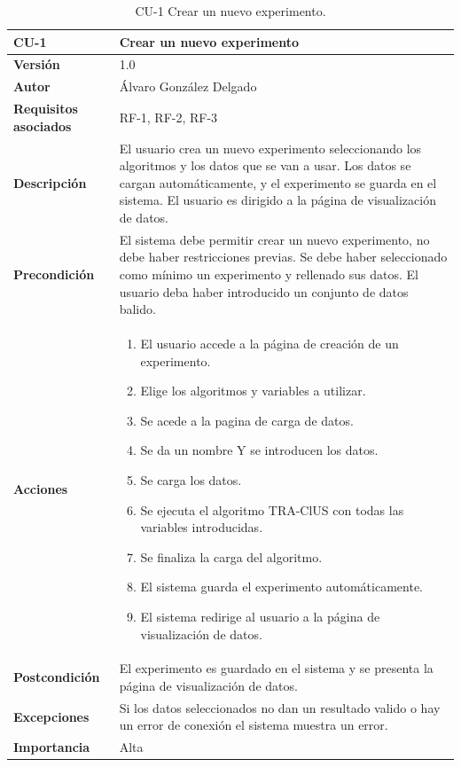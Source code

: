 \begin{table}[p]
	\centering
	\begin{tabularx}{\linewidth}{ p{} p{} }
		\toprule
		\textbf{CU-1}    & \textbf{Crear un nuevo experimento} \\
		\toprule
		\textbf{Versión}              & 1.0    \\
		\textbf{Autor}                & Álvaro González Delgado \\ 
		\textbf{Requisitos asociados} & RF-1, RF-2, RF-3 \\
		\textbf{Descripción}          & El usuario crea un nuevo experimento seleccionando los algoritmos y los datos que se van a usar. Los datos se cargan automáticamente, y el experimento se guarda en el sistema. El usuario es dirigido a la página de visualización de datos. \\
		\textbf{Precondición}         & El sistema debe permitir crear un nuevo experimento, no debe haber restricciones previas. Se debe haber seleccionado como mínimo un experimento y rellenado sus datos. El usuario deba haber introducido un conjunto de datos balido. \\
		
		\textbf{Acciones}             &
		\begin{enumerate}
			\item El usuario accede a la página de creación de un experimento.
			\item Elige los algoritmos y variables a utilizar.
			\item Se acede a la pagina de carga de datos.
			\item Se da un nombre Y se introducen los datos.
			\item Se carga los datos.
			\item Se ejecuta el algoritmo TRA-ClUS con todas las variables introducidas.
			\item Se finaliza la carga del algoritmo.
			\item El sistema guarda el experimento automáticamente.
			\item El sistema redirige al usuario a la página de visualización de datos.
		\end{enumerate} \\
		\textbf{Postcondición}        & El experimento es guardado en el sistema y se presenta la página de visualización de datos. \\
		\textbf{Excepciones}          & Si los datos seleccionados no dan un resultado valido o hay un error de conexión el sistema muestra un error. \\
		\textbf{Importancia}          & Alta \\
		\bottomrule
	\end{tabularx}
	\caption{CU-1 Crear un nuevo experimento.}
\end{table}

